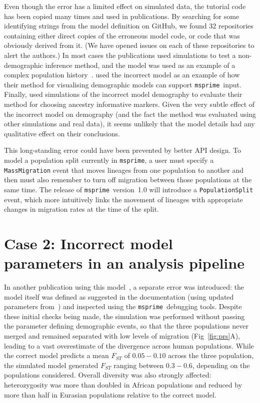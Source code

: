 \documentclass{article}
\newcommand{\msprime}[0]{\texttt{msprime}}
\begin{document}
Even though the error has a limited effect on simulated data, the tutorial code has been
copied many times and used in publications. By searching for some identifying strings
from the model definition on GitHub,
we found 32 repositories containing either direct copies of the
erroneous model code, or code that was obviously derived from it.
(We have opened issues on each of these repositories to alert the authors.)
In most cases the publications used simulations to test a non-demographic inference
method, and the model was used as an example of a complex population
history~\citep{kelleher2019inferring,albers2020dating,tong2020population}.
\cite{zhou2018popdemog} used the incorrect model as an example
of how their method for visualising demographic models can support
\msprime\ input.
Finally, \cite{pfaffelhuber2020choose}
used simulations of the incorrect model demography to evaluate
their method for choosing ancestry informative markers.
Given the very subtle effect of the incorrect
model on demography (and the fact the method was evaluated using other
simulations and real data), it seems unlikely that the model details
had any qualitative effect on their conclusions.

This long-standing error could have been prevented by better API design.
To model a population split currently in \msprime, a user must specify a
\texttt{MassMigration} event that moves lineages from one population to another
and then must also remember to turn off migration
between those populations at the same time.
The release of \msprime\ version~1.0 will introduce a \texttt{PopulationSplit} event,
which more intuitively links the movement of lineages with appropriate changes in
migration rates at the time of the split.

\section*{Case 2: Incorrect model parameters in an analysis pipeline}

In another publication using this model~\citep{martin2017human},
a separate error was introduced: the model itself was defined as suggested
in the documentation (using updated parameters
from~\citet{gravel2011demographic}) and inspected
using the \msprime\ debugging tools.
Despite these initial checks being made, the simulation
was performed without passing the parameter defining demographic events,
so that the three populations
never merged and remained separated with low levels of migration (Fig~\ref{fig:prs}A),
leading to a vast overestimate of the divergence across human populations.
While the correct model predicts a mean $F_{ST}$ of
$0.05 - 0.10$ across the three population, the simulated model generated $F_{ST}$
ranging between $0.3 - 0.6$, depending on the populations considered.
Overall diversity was also strongly affected: heterozygosity was more than
doubled in African populations and reduced by more than half in Eurasian populations
relative to the correct model.
\end{document}
